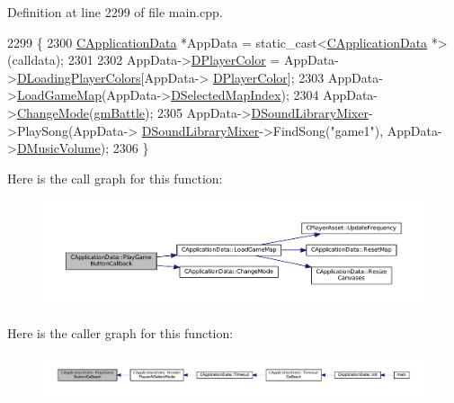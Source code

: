 Definition at line 2299 of file main.\+cpp.


\begin{DoxyCode}
2299                                                            \{
2300     \hyperlink{classCApplicationData}{CApplicationData} *AppData = \textcolor{keyword}{static\_cast<}\hyperlink{classCApplicationData}{CApplicationData} *\textcolor{keyword}{>}(calldata);
2301     
2302     AppData->\hyperlink{classCApplicationData_a53550939b20cba70570f113e4d1c5d02}{DPlayerColor} = AppData->\hyperlink{classCApplicationData_ab29b80d90f1201608dcb498cd627a6f9}{DLoadingPlayerColors}[AppData->
      \hyperlink{classCApplicationData_a53550939b20cba70570f113e4d1c5d02}{DPlayerColor}];
2303     AppData->\hyperlink{classCApplicationData_a89af0c7917be766575720e5ac79c8d2d}{LoadGameMap}(AppData->\hyperlink{classCApplicationData_a279cfd90004e3f1b90b119358ff25586}{DSelectedMapIndex});
2304     AppData->\hyperlink{classCApplicationData_aee18c113e9a0acb3cad3d63eb19de71b}{ChangeMode}(\hyperlink{classCApplicationData_ac8ac37a4c8bb871036fbbdc6a072e403a00a1759bd54eaaa07aab7575dbae51fc}{gmBattle});
2305     AppData->\hyperlink{classCApplicationData_aa1e6876121bb4fb229ec6b930a8a6766}{DSoundLibraryMixer}->PlaySong(AppData->
      \hyperlink{classCApplicationData_aa1e6876121bb4fb229ec6b930a8a6766}{DSoundLibraryMixer}->FindSong(\textcolor{stringliteral}{"game1"}), AppData->\hyperlink{classCApplicationData_a8bc61af4a83a667102e55cca2a739c3b}{DMusicVolume});
2306 \}
\end{DoxyCode}
Here is the call graph for this function\+:\nopagebreak
\begin{figure}[H]
\begin{center}
\leavevmode
\includegraphics[width=350pt]{classCApplicationData_a659aa43022e92610c2f8cc182eab1b8e_cgraph}
\end{center}
\end{figure}
Here is the caller graph for this function\+:\nopagebreak
\begin{figure}[H]
\begin{center}
\leavevmode
\includegraphics[width=350pt]{classCApplicationData_a659aa43022e92610c2f8cc182eab1b8e_icgraph}
\end{center}
\end{figure}
\hypertarget{classCApplicationData_a10e56e4604f1f0823af659a7989fea9d}{}\label{classCApplicationData_a10e56e4604f1f0823af659a7989fea9d} 
